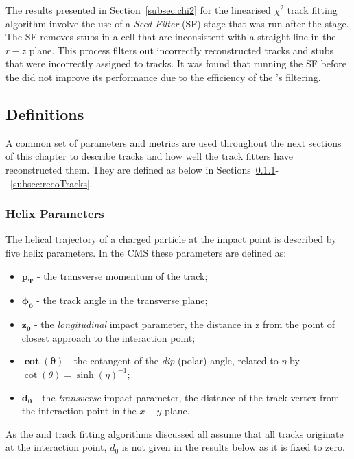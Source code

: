 The results presented in Section~\ref{subsec:chi2} for the linearised $\chi^{2}$ track fitting algorithm involve the use of a \emph{Seed Filter} (SF) stage that was run after the \HT stage.
The SF removes stubs in a \HT cell that are inconsistent with a straight line in the \emph{$r-z$} plane.
This process filters out incorrectly reconstructed tracks and stubs that were incorrectly assigned to tracks.
It was found that running the SF before the \KF did not improve its performance due to the efficiency of the \KF's filtering.

\subsection{Definitions}\label{subsec:definitions}
A common set of parameters and metrics are used throughout the next sections of this chapter to describe tracks and how well the track fitters have reconstructed them.
They are defined as below in Sections~\ref{subsec:helixParameter}-~\ref{subsec:recoTracks}.

\subsubsection{Helix Parameters}\label{subsec:helixParameter}
The helical trajectory of a charged particle at the impact point is described by five helix parameters.
In the CMS these parameters are defined as:

\begin{itemize}
\item $\bm{p_{T}}$ - the transverse momentum of the track;
\item $\bm{\phi_{0}}$ - the track angle in the transverse plane;
\item $\bm{z_{0}}$ - the \emph{longitudinal} impact parameter, \ie the distance in z from the point of closest approach to the interaction point;
\item $\bm{\cot(\theta)}$ - the cotangent of the \emph{dip} (polar) angle, related to $\eta$ by $\cot(\theta) = \sinh (\eta)^{-1}$;
\item $\bm{d_{0}}$ - the \emph{transverse} impact parameter, \ie the distance of the track vertex from the interaction point in the $x-y$ plane. 
\end{itemize}

As the \HT and track fitting algorithms discussed all assume that all tracks originate at the interaction point, $d_{0}$ is not given in the results below as it is fixed to zero.

